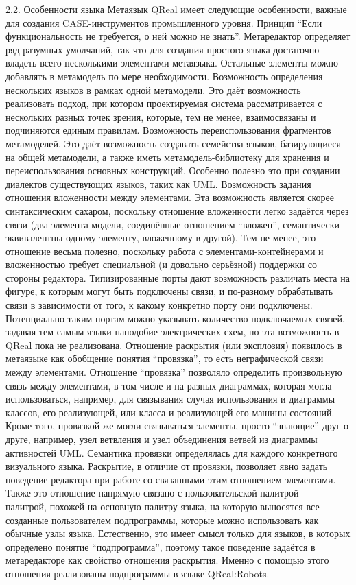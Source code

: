 2.2. Особенности языка
	Метаязык QReal имеет следующие особенности, важные для создания CASE-инструментов промышленного уровня.
Принцип “Если функциональность не требуется, о ней можно не знать”. Метаредактор определяет ряд разумных умолчаний, так что для создания простого языка достаточно владеть всего несколькими элементами метаязыка. Остальные элементы можно добавлять в метамодель по мере необходимости.
Возможность определения нескольких языков в рамках одной метамодели. Это даёт возможность реализовать подход, при котором проектируемая система рассматривается с нескольких разных точек зрения, которые, тем не менее, взаимосвязаны и подчиняются единым правилам.
Возможность переиспользования фрагментов метамоделей. Это даёт возможность создавать семейства языков, базирующиеся на общей метамодели, а также иметь метамодель-библиотеку для хранения и переиспользования основных конструкций. Особенно полезно это при создании диалектов существующих языков, таких как UML.
Возможность задания отношения вложенности между элементами. Эта возможность является скорее синтаксическим сахаром, поскольку отношение вложенности легко задаётся через связи (два элемента модели, соединённые отношением “вложен”, семантически эквивалентны одному элементу, вложенному в другой). Тем не менее, это отношение весьма полезно, поскольку работа с элементами-контейнерами и вложенностью требует специальной (и довольно серьёзной) поддержки со стороны редактора.
Типизированные порты дают возможность различать места на фигуре, к которым могут быть подключены связи, и по-разному обрабатывать связи в зависимости от того, к какому конкретно порту они подключены. Потенциально таким портам можно указывать количество подключаемых связей, задавая тем самым языки наподобие электрических схем, но эта возможность в QReal пока не реализована.
Отношение раскрытия (или эксплозия) появилось в метаязыке как обобщение понятия “провязка”, то есть неграфической связи между элементами. Отношение “провязка” позволяло определить произвольную связь между элементами, в том числе и на разных диаграммах, которая могла использоваться, например, для связывания случая использования и диаграммы классов, его реализующей, или класса и реализующей его машины состояний. Кроме того, провязкой же могли связываться элементы, просто “знающие” друг о друге, например, узел ветвления и узел объединения ветвей из диаграммы активностей UML. Семантика провязки определялась для каждого конкретного визуального языка. Раскрытие, в отличие от провязки, позволяет явно задать поведение редактора при работе со связанными этим отношением элементами. Также это отношение напрямую связано с пользовательской палитрой --- палитрой, похожей на основную палитру языка, на которую выносятся все созданные пользователем подпрограммы, которые можно использовать как обычные узлы языка. Естественно, это имеет смысл только для языков, в которых определено понятие “подпрограмма”, поэтому такое поведение задаётся в метаредакторе как свойство отношения раскрытия. Именно с помощью этого отношения реализованы подпрограммы в языке QReal:Robots.
